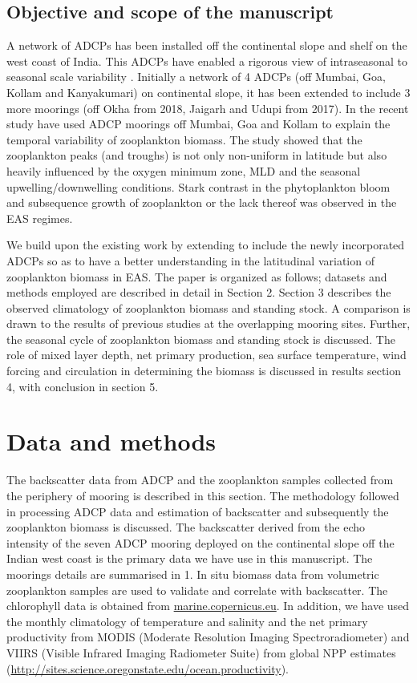 \documentclass{article}
\begin{document}
	\subsection{Objective and scope of the manuscript}
	
	A network of ADCPs has been installed off the continental slope and shelf on the west coast of India. This ADCPs have enabled a rigorous view of intraseasonal to seasonal scale variability \citep{amol2014observed, chaudhuri2020observed}. Initially a network of 4 ADCPs (off Mumbai, Goa, Kollam and Kanyakumari) on continental slope, it has been extended to include 3 more moorings (off Okha from 2018, Jaigarh and Udupi from 2017). In the recent study \citep{aparna2022seasonal} have used ADCP moorings off  Mumbai, Goa and Kollam to explain the temporal variability of zooplankton biomass. The study showed that the zooplankton peaks (and troughs) is not only non-uniform in latitude but also heavily influenced by the oxygen minimum zone, MLD and the seasonal upwelling/downwelling conditions. Stark contrast in the phytoplankton bloom and subsequence  growth of zooplankton or the lack thereof was observed in the EAS regimes.


	We build upon the existing work by extending to include the newly incorporated ADCPs so as to have a better understanding in the latitudinal variation of zooplankton biomass in EAS. The paper is organized as follows; datasets and methods employed are described in detail in Section 2. Section 3 describes the observed climatology of zooplankton biomass and standing stock. A comparison is drawn to the results of previous studies at the overlapping mooring sites. Further, the seasonal cycle of zooplankton biomass and standing stock is discussed. The role of mixed layer depth, net primary production, sea surface temperature, wind forcing and circulation in determining the biomass is discussed in results section 4, with conclusion in section 5.
	
	\section{Data and methods}
	The  backscatter data from ADCP and the zooplankton samples collected from the periphery of mooring is described in this section. The methodology followed in processing ADCP data and estimation of backscatter and subsequently the zooplankton biomass is discussed. The backscatter derived from the echo intensity of the seven ADCP mooring deployed on the continental slope off the Indian west coast is the primary data we have use in this manuscript. The moorings details are summarised in \tablename{1}. In situ biomass data from volumetric zooplankton samples are used to validate and correlate with backscatter. The chlorophyll data is obtained from \href{https://data.marine.copernicus.eu/products}{marine.copernicus.eu}. In addition, we have used the monthly climatology of temperature and salinity \citep{chatterjee2012new} and the net primary productivity from MODIS (Moderate Resolution Imaging Spectroradiometer) and VIIRS (Visible Infrared Imaging Radiometer Suite) from global NPP estimates (\href{http://sites.science.oregonstate.edu/ocean.productivity}{http://sites.science.oregonstate.edu/ocean.productivity}). 
	
\end{document}
